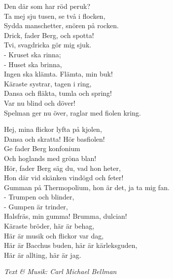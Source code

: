 Den där som har röd peruk?\\
Ta mej sju tusen, se två i flocken,\\
Sydda manschetter, snören på rocken.\\
Drick, fader Berg, och spotta!\\
Tvi, svagdricka gör mig sjuk.\\
- Kruset ska rinna;\\
- Huset ska brinna,\\
Ingen ska klämta. Flämta, min buk!\\
Käraste systrar, tagen i ring,\\
Dansa och fläkta, tumla och spring!\\
Var nu blind och döver!\\
Spelman ger nu över, raglar med fiolen kring.\par
\vspace{10pt}
Hej, mina flickor lyfta på kjolen,\\
Dansa och skratta! Hör basfiolen!\\
Ge fader Berg konfonium\\
Och hoglands med gröna blan!\\
Hör, fader Berg säg du, vad hon heter,\\
Hon där vid skänken vindögd och feter!\\
Gumman på Thermopolium, hon är det, ja ta mig fan.\\
- Trumpen och blinder,\\
- Gumpen är trinder,\\
Halsfräs, min gumma! Brumma, dulcian!\\
Käraste bröder, här är behag,\\
Här är musik och flickor var dag,\\
Här är Bacchus buden, här är kärleksguden,\\
Här är allting, här är jag.\par
\vspace{10pt}
{\footnotesize\textit{Text \& Musik: Carl Michael Bellman}}
